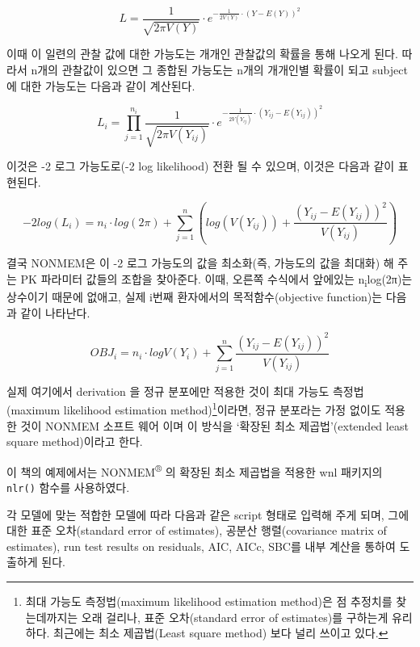 \documentclass[
  11pt,
  krantz2, a4paper, twoside]{krantz}
\theoremstyle{definition}
\theoremstyle{definition}
\theoremstyle{definition}
\theoremstyle{definition}
\theoremstyle{remark}
\begin{document}
\begin{equation}
L = \frac{1}{\sqrt{2\pi V(Y)}} \cdot e^{-\frac{1}{2V(Y)}\cdot(Y-E(Y))^2}
\label{eq:eq5-1}
\end{equation}

이때 이 일련의 관찰 값에 대한 가능도는 개개인 관찰값의 확률을 통해 나오게 된다. 
따라서 n개의 관찰값이 있으면 그 종합된 가능도는 n개의 개개인별 확률이 되고 subject에 대한 가능도는 다음과 같이 계산된다.

\begin{equation}
L_i = \prod_{j=1}^{n_i}\frac{1}{\sqrt{2\pi V(Y_{ij})}} \cdot e^{-\frac{1}{2V(Y_{ij})}\cdot(Y_{ij}-E(Y_{ij}))^2}
\label{eq:eq5-2}
\end{equation}

이것은 -2 로그 가능도로(-2 log likelihood) 전환 될 수 있으며, 이것은 다음과 같이 표현된다.

\begin{equation}
-2log(L_i) = n_i \cdot log(2\pi) + \sum_{j=1}^{n}(log(V(Y_{ij}))+ \frac{(Y_{ij} - E(Y_{ij}))^2}{V(Y_{ij})})
\label{eq:eq5-3}
\end{equation}

결국 NONMEM은 이 -2 로그 가능도의 값을 최소화(즉, 가능도의 값을 최대화) 해 주는 PK 파라미터 값들의 조합을 찾아준다. 이때, 오른쪽 수식에서 앞에있는 n\textsubscript{i}log(2π)는 상수이기 때문에 없애고, 실제 i번째 환자에서의 목적함수(objective function)는 다음과 같이 나타난다.

\begin{equation}
OBJ_i = n_i \cdot logV(Y_i) + \sum_{j=1}^{n} \frac{(Y_{ij} - E(Y_{ij}))^2}{V(Y_{ij})}
\label{eq:eq5-4}
\end{equation}

실제 여기에서 derivation 을 정규 분포에만 적용한 것이 최대 가능도 측정법(maximum likelihood estimation method)\footnote{최대 가능도 측정법(maximum likelihood estimation method)은 점 추정치를 찾는데까지는 오래 걸리나, 표준 오차(standard error of estimates)를 구하는게 유리하다. 최근에는 최소 제곱법(Least square method) 보다 널리 쓰이고 있다.}이라면, 정규 분포라는 가정 없이도 적용한 것이 NONMEM 소프트 웨어 이며 이 방식을 `확장된 최소 제곱법'(extended least square method)이라고 한다. 

이 책의 예제에서는 NONMEM\textsuperscript{®} 의 확장된 최소 제곱법을 적용한 wnl 패키지의 \texttt{nlr()} 함수를 사용하였다.

각 모델에 맞는 적합한 모델에 따라 다음과 같은 script 형태로 입력해 주게 되며, 그에 대한 표준 오차(standard error of estimates), 공분산 행렬(covariance matrix of estimates), run test results on residuals, AIC, AICc, SBC를 내부 계산을 통하여 도출하게 된다.
\end{document}

